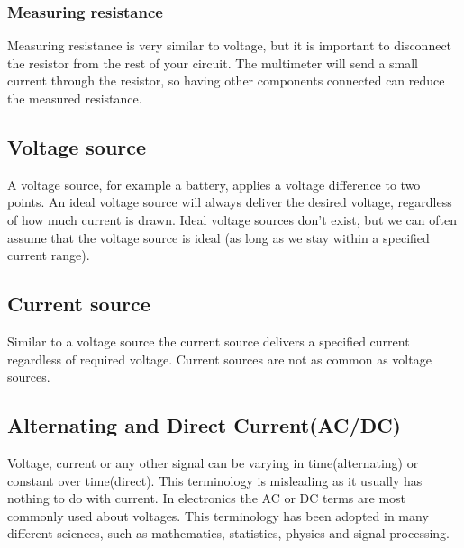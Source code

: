 \subsubsection{Measuring resistance}
Measuring resistance is very similar to voltage, but it is important to 
disconnect the resistor from the rest of your circuit. The multimeter will 
send a small current through the resistor, so having other components 
connected can reduce the measured resistance.

\subsection{Voltage source}
A voltage source, for example a battery, applies a voltage difference to two 
points. An ideal voltage source will always deliver the desired voltage, regardless of how much current is drawn. Ideal voltage sources don't exist, 
but we can often assume that the voltage source is ideal (as long as we stay within a specified current range).

\subsection{Current source}
Similar to a voltage source the current source delivers a specified current 
regardless of required voltage. Current sources are not as common as voltage 
sources.

\subsection{Alternating and Direct Current(AC/DC)}
Voltage, current or any other signal can be varying in time(alternating) or 
constant over time(direct). This terminology is misleading as it usually has
nothing to do with current. In electronics the AC or DC terms are most 
commonly used about voltages. This terminology has been adopted in many 
different sciences, such as mathematics, statistics, physics and signal 
processing. 
